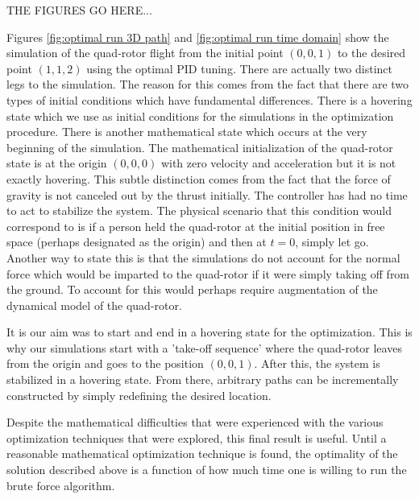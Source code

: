 {\color{red} THE FIGURES GO HERE... }

Figures \ref{fig:optimal run 3D path} and \ref{fig:optimal run time domain} show the simulation of the quad-rotor flight from the initial point $(0,0,1)$ to the desired point $(1,1,2)$ using the optimal PID tuning. There are actually two distinct legs to the simulation. The reason for this comes from the fact that there are two types of initial conditions which have fundamental differences. There is a hovering state which we use as initial conditions for the simulations in the optimization procedure. There is another mathematical state which occurs at the very beginning of the simulation. The mathematical initialization of the quad-rotor state is at the origin $(0,0,0)$ with zero velocity and acceleration but it is not exactly hovering. This subtle distinction comes from the fact that the force of gravity is not canceled out by the thrust initially. The controller has had no time to act to stabilize the system. The physical scenario that this condition would correspond to is if a person held the quad-rotor at the initial position in free space (perhaps designated as the origin) and then at $t=0$, simply let go. Another way to state this is that the simulations do not account for the normal force which would be imparted to the quad-rotor if it were simply taking off from the ground. To account for this would perhaps require augmentation of the dynamical model of the quad-rotor. 

It is our aim was to start and end in a hovering state for the optimization. This is why our simulations start with a 'take-off sequence' where the quad-rotor leaves from the origin and goes to the position $(0,0,1)$. After this, the system is stabilized in a hovering state. From there, arbitrary paths can be incrementally constructed by simply redefining the desired location.

Despite the mathematical difficulties that were experienced with the various optimization techniques that were explored, this final result is useful. Until a reasonable mathematical optimization technique is found, the optimality of the solution described above is a function of how much time one is willing to run the brute force algorithm. 































